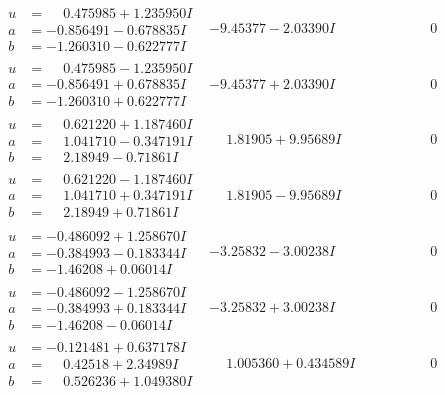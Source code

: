 \documentclass[1p]{elsarticle_modified}
\theoremstyle{definition}
\begin{document}
$$\begin{array}{c|c|c}
\begin{aligned}
u &= \phantom{-}0.475985 + 1.235950 I \\
a &= -0.856491 - 0.678835 I \\
b &= -1.260310 - 0.622777 I\end{aligned}
 & -9.45377 - 2.03390 I & \phantom{-0.000000 } 0 \\ \hline\begin{aligned}
u &= \phantom{-}0.475985 - 1.235950 I \\
a &= -0.856491 + 0.678835 I \\
b &= -1.260310 + 0.622777 I\end{aligned}
 & -9.45377 + 2.03390 I & \phantom{-0.000000 } 0 \\ \hline\begin{aligned}
u &= \phantom{-}0.621220 + 1.187460 I \\
a &= \phantom{-}1.041710 - 0.347191 I \\
b &= \phantom{-}2.18949 - 0.71861 I\end{aligned}
 & \phantom{-}1.81905 + 9.95689 I & \phantom{-0.000000 } 0 \\ \hline\begin{aligned}
u &= \phantom{-}0.621220 - 1.187460 I \\
a &= \phantom{-}1.041710 + 0.347191 I \\
b &= \phantom{-}2.18949 + 0.71861 I\end{aligned}
 & \phantom{-}1.81905 - 9.95689 I & \phantom{-0.000000 } 0 \\ \hline\begin{aligned}
u &= -0.486092 + 1.258670 I \\
a &= -0.384993 - 0.183344 I \\
b &= -1.46208 + 0.06014 I\end{aligned}
 & -3.25832 - 3.00238 I & \phantom{-0.000000 } 0 \\ \hline\begin{aligned}
u &= -0.486092 - 1.258670 I \\
a &= -0.384993 + 0.183344 I \\
b &= -1.46208 - 0.06014 I\end{aligned}
 & -3.25832 + 3.00238 I & \phantom{-0.000000 } 0 \\ \hline\begin{aligned}
u &= -0.121481 + 0.637178 I \\
a &= \phantom{-}0.42518 + 2.34989 I \\
b &= \phantom{-}0.526236 + 1.049380 I\end{aligned}
 & \phantom{-}1.005360 + 0.434589 I & \phantom{-0.000000 } 0 \\ \hline\begin{aligned}

\end{aligned}
\end{array}$$
\end{document}
